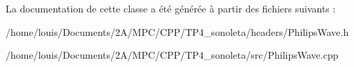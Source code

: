 La documentation de cette classe a été générée à partir des fichiers suivants \+:\begin{DoxyCompactItemize}
\item 
/home/louis/\+Documents/2\+A/\+M\+P\+C/\+C\+P\+P/\+T\+P4\+\_\+sonoleta/headers/Philips\+Wave.\+h\item 
/home/louis/\+Documents/2\+A/\+M\+P\+C/\+C\+P\+P/\+T\+P4\+\_\+sonoleta/src/Philips\+Wave.\+cpp\end{DoxyCompactItemize}
